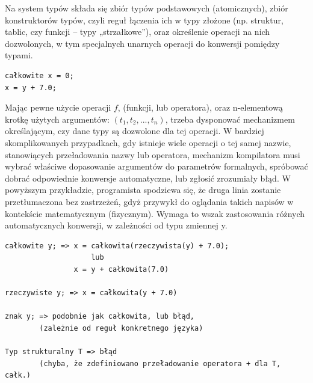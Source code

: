 Na system typów składa się zbiór typów podstawowych (atomicznych), zbiór konstruktorów typów, czyli reguł łączenia ich w typy złożone (np. struktur, tablic, czy funkcji – typy „strzałkowe”), oraz określenie operacji na nich dozwolonych, w tym specjalnych unarnych operacji do konwersji pomiędzy typami.
\begin{lstlisting}
całkowite x = 0;
x = y + 7.0;
\end{lstlisting}
Mając pewne użycie operacji $f$, (funkcji, lub operatora), oraz n-elementową krotkę użytych argumentów: $(t_1, t_2, ..., t_n)$, trzeba dysponować mechanizmem określającym, czy dane typy są dozwolone dla tej operacji. W bardziej skomplikowanych przypadkach, gdy istnieje wiele operacji o tej samej nazwie, stanowiących przeładowania nazwy lub operatora, mechanizm kompilatora musi wybrać właściwe dopasowanie argumentów do parametrów formalnych, spróbować dobrać odpowiednie konwersje automatyczne, lub zgłosić zrozumiały błąd.
W powyższym przykładzie, programista spodziewa się, że druga linia zostanie przetłumaczona bez zastrzeżeń, gdyż przywykł do oglądania takich napisów w kontekście matematycznym (fizycznym). Wymaga to wszak zastosowania różnych automatycznych konwersji, w zależności od typu zmiennej y.


\begin{lstlisting}
całkowite y; => x = całkowita(rzeczywista(y) + 7.0); 
                    lub
                x = y + całkowita(7.0)
                
rzeczywiste y; => x = całkowita(y + 7.0)

znak y; => podobnie jak całkowita, lub błąd, 
        (zależnie od reguł konkretnego języka)

Typ strukturalny T => błąd
        (chyba, że zdefiniowano przeładowanie operatora + dla T, całk.)
\end{lstlisting}

